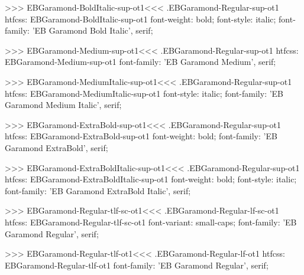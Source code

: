 {{{{{{{>>>
\<EBGaramond-BoldItalic-sup-ot1\><<<
.EBGaramond-Regular-sup-ot1
htfcss:  EBGaramond-BoldItalic-sup-ot1  font-weight: bold; font-style: italic; font-family: 'EB Garamond Bold Italic', serif;

>>>
\<EBGaramond-Medium-sup-ot1\><<<
.EBGaramond-Regular-sup-ot1
htfcss:  EBGaramond-Medium-sup-ot1  font-family: 'EB Garamond Medium', serif;

>>>
\<EBGaramond-MediumItalic-sup-ot1\><<<
.EBGaramond-Regular-sup-ot1
htfcss:  EBGaramond-MediumItalic-sup-ot1  font-style: italic; font-family: 'EB Garamond Medium Italic', serif;

>>>
\<EBGaramond-ExtraBold-sup-ot1\><<<
.EBGaramond-Regular-sup-ot1
htfcss:  EBGaramond-ExtraBold-sup-ot1  font-weight: bold; font-family: 'EB Garamond ExtraBold', serif;

>>>
\<EBGaramond-ExtraBoldItalic-sup-ot1\><<<
.EBGaramond-Regular-sup-ot1
htfcss:  EBGaramond-ExtraBoldItalic-sup-ot1  font-weight: bold; font-style: italic; font-family: 'EB Garamond ExtraBold Italic', serif;

>>>
\<EBGaramond-Regular-tlf-sc-ot1\><<<
.EBGaramond-Regular-lf-sc-ot1
htfcss:  EBGaramond-Regular-tlf-sc-ot1  font-variant: small-caps; font-family: 'EB Garamond Regular', serif;

>>>
\<EBGaramond-Regular-tlf-ot1\><<<
.EBGaramond-Regular-lf-ot1
htfcss:  EBGaramond-Regular-tlf-ot1  font-family: 'EB Garamond Regular', serif;

}}}}}}}
